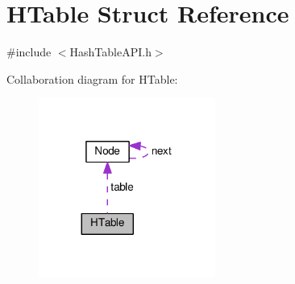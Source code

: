 \hypertarget{structHTable}{}\section{H\+Table Struct Reference}
\label{structHTable}


{\ttfamily \#include $<$Hash\+Table\+A\+P\+I.\+h$>$}



Collaboration diagram for H\+Table\+:
\nopagebreak
\begin{figure}[H]
\begin{center}
\leavevmode
\includegraphics[width=164pt]{structHTable__coll__graph}
\end{center}
\end{figure}
